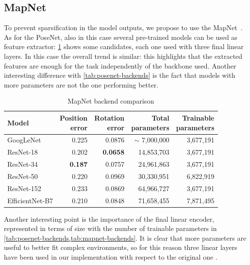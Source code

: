 \subsection{MapNet}
To prevent sparsification in the model outputs, we propose to use the MapNet~\cite{mapnet}. As for the PoseNet, also in this case several pre-trained models can be used as feature extractor: \cref{tab:mapnet-backends} shows some candidates, each one used with three final linear layers.
In this case the overall trend is similar: this highlights that the extracted features are enough for the task independently of the backbone used. Another interesting difference with \cref{tab:posenet-backends} is the fact that models with more parameters are not the one performing better.
\begin{table}[htbp]
    \caption{MapNet backend comparison}
    \begin{center}
        \begin{tabular}{lrrrr}
            \toprule
            {Model}         & \thead{Position                                                  \\error} & \thead{Rotation\\error} & \thead{Total\\parameters} & \thead{Trainable\\parameters} \\
            \midrule
            GoogLeNet       & 0.225           & 0.0876          & $\sim$ 7,000,000 & 3,677,191 \\
            ResNet-18       & 0.202           & \textbf{0.0658} & 14,853,703       & 3,677,191 \\
            ResNet-34       & \textbf{0.187}  & 0.0757          & 24,961,863       & 3,677,191 \\
            ResNet-50       & 0.220           & 0.0969          & 30,330,951       & 6,822,919 \\
            ResNet-152      & 0.233           & 0.0869          & 64,966,727       & 3,677,191 \\
            EfficientNet-B7 & 0.210           & 0.0848          & 71,658,455       & 7,871,495 \\
            \bottomrule
        \end{tabular}
        \label{tab:mapnet-backends}
    \end{center}
\end{table}

Another interesting point is the importance of the final linear encoder, represented in terms of size with the number of trainable parameters in \cref{tab:posenet-backends,tab:mapnet-backends}. It is clear that more parameters are useful to better fit complex environments, so for this reason three linear layers have been used in our implementation with respect to the original one \cite{mapnet}.


